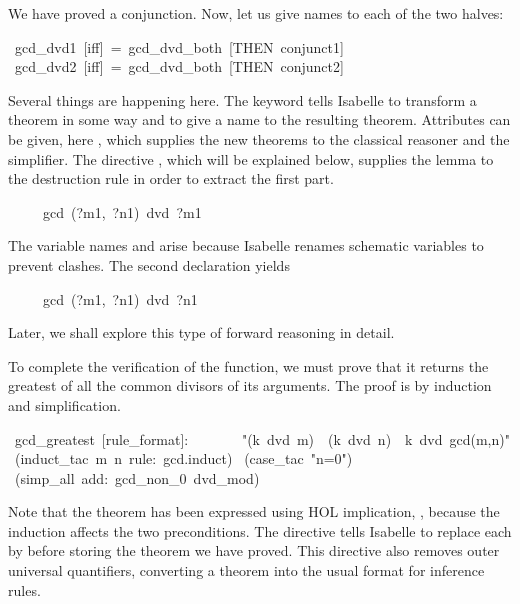 \medskip
We have proved a conjunction.  Now, let us give names to each of the
two halves:
\begin{isabelle}
\ gcd_dvd1\ [iff]\ =\ gcd_dvd_both\ [THEN\ conjunct1]\isanewline
{}\ gcd_dvd2\ [iff]\ =\ gcd_dvd_both\ [THEN\ conjunct2]%
\end{isabelle}

Several things are happening here. The keyword 
tells Isabelle to transform a theorem in some way and to
give a name to the resulting theorem.  Attributes can be given,
here , which supplies the new theorems to the classical reasoner
and the simplifier.  The directive {}, which will be explained
below, supplies the lemma 
 to the
destruction rule  in order to extract the first part.
\begin{isabelle}
\ \ \ \ \ gcd\
(?m1,\
?n1)\ dvd\
?m1%
\end{isabelle}
The variable names  and  arise because
Isabelle renames schematic variables to prevent 
clashes.  The second  declaration yields
\begin{isabelle}
\ \ \ \ \ gcd\
(?m1,\
?n1)\ dvd\
?n1%
\end{isabelle}
Later, we shall explore this type of forward reasoning in detail. 

To complete the verification of the {} function, we must 
prove that it returns the greatest of all the common divisors 
of its arguments.  The proof is by induction and simplification.
\begin{isabelle}
\isacommand{lemma}\ gcd_greatest\
[rule_format]:\isanewline
\ \ \ \ \ \ \ "(k\ dvd\
m)\ \isasymlongrightarrow\ (k\ dvd\
n)\ \isasymlongrightarrow\ k\ dvd\
gcd(m,n)"\isanewline
\isacommand{apply}\ (induct_tac\ m\ n\
rule:\ gcd.induct)\isanewline
\isacommand{apply}\ (case_tac\ "n=0")\isanewline
\isacommand{apply}\ (simp_all\ add:\ gcd_non_0\ dvd_mod)\isanewline
\isacommand{done}
\end{isabelle}
%
Note that the theorem has been expressed using HOL implication,
\isa{\isasymlongrightarrow}, because the induction affects the two
preconditions.  The directive  tells Isabelle to replace
each \isa{\isasymlongrightarrow} by \isa{\isasymLongrightarrow} before
storing the theorem we have proved.  This directive also removes outer
universal quantifiers, converting a theorem into the usual format for
inference rules.

